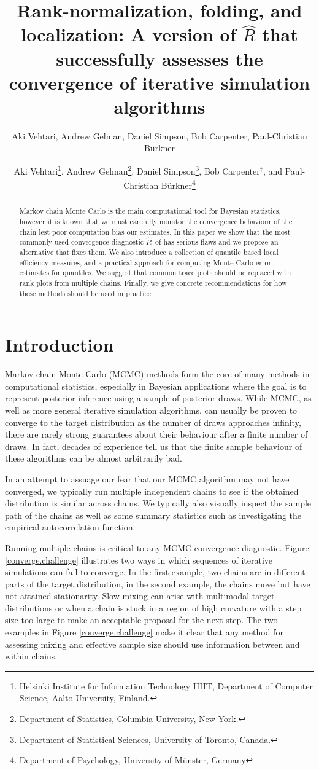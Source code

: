 \documentclass[american,]{article}
\title{Rank-normalization, folding, and localization: A version of $\widehat{R}$ that successfully assesses the convergence of iterative simulation algorithms}
\author{Aki Vehtari, Andrew Gelman, Daniel Simpson, Bob Carpenter, Paul-Christian Bürkner}
\author{
Aki Vehtari\footnote{Helsinki Institute for Information Technology HIIT,
  Department of Computer Science, Aalto University, Finland.},
   Andrew Gelman\footnote{Department of Statistics, Columbia University, New York.},
 Daniel Simpson\footnote{Department of Statistical Sciences, University of Toronto, Canada.},
 Bob Carpenter$^{\dagger}$,
and Paul-Christian B\"{u}rkner\footnote{Department of Psychology, University of M\"{u}nster, Germany}
}
\newcommand{\Rhat}{$\widehat{R}$}
\theoremstyle{definition}
\begin{document}
\maketitle
\begin{abstract}
  Markov chain Monte Carlo is the main computational tool for Bayesian 
  statistics, however it is known that we must carefully monitor the
  convergence behaviour of the chain lest poor computation bias our estimates.
In this paper we show that the most commonly used convergence diagnostic \Rhat\ 
of \citet{Gelman+Rubin:1992} has serious flaws and we
propose an alternative that fixes them. We also introduce
  a collection of quantile based local efficiency
  measures, and a practical approach for computing Monte Carlo error
  estimates for quantiles. We suggest that common trace plots should
  be replaced with rank plots from multiple chains. Finally, we give
  concrete recommendations for how these methods should be used
  in practice.
\end{abstract}

\hypertarget{introduction}{%
\section{Introduction}\label{introduction}}

 Markov chain Monte Carlo (MCMC) methods form the core
of many methods in computational statistics, especially 
in Bayesian applications where the goal is to represent
posterior inference using a sample of posterior draws. While MCMC, 
as well as more general iterative
simulation algorithms, can usually be proven to converge
to the target distribution as the number of draws approaches infinity,
there are rarely strong guarantees about their behaviour after a 
finite number of draws. In fact, decades of experience tell us that
the finite sample behaviour of these algorithms can be almost arbitrarily bad.


In an attempt to assuage our fear that our MCMC algorithm may
not have converged, we typically run multiple 
independent chains  to see if the obtained 
distribution is similar across chains.  We typically also visually inspect
the sample path of the chains as well as some summary statistics such as
investigating the empirical autocorrelation function. 

Running multiple chains is critical to any MCMC convergence diagnostic. Figure
\ref{converge.challenge} illustrates two ways in which sequences of
iterative simulations can fail to converge.  In the first example, two chains
are in different parts of the target distribution, in the second
example, the chains move but have not attained stationarity. Slow mixing can arise with multimodal target distributions or when a chain is
stuck in a region of high curvature with a step size too large to make an
acceptable proposal for the next step. The two examples in Figure \ref{converge.challenge}  make it clear that 
any method for assessing mixing and effective sample size should use information
between and within chains.
\end{document}
